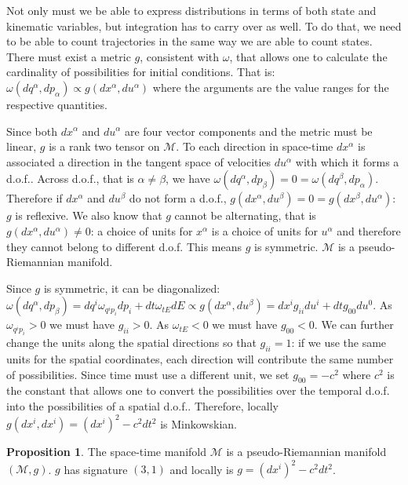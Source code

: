 \documentclass[aps,pra,10pt,twocolumn,floatfix,nofootinbib]{revtex4-1}
\numberwithin{equation}{section}
\theoremstyle{definition}
\newtheorem{prop}[equation]{Proposition}
\begin{document}
Not only must we be able to express distributions in terms of both state and kinematic variables, but integration has to carry over as well. To do that, we need to be able to count trajectories in the same way we are able to count states. There must exist a metric $g$, consistent with $\omega$, that allows one to calculate the cardinality of possibilities for initial conditions. That is: $\omega(dq^\alpha,dp_\alpha) \propto g(dx^\alpha,du^\alpha)$ where the arguments are the value ranges for the respective quantities.

Since both $dx^\alpha$ and $du^\alpha$ are four vector components and the metric must be linear, $g$ is a rank two tensor on $\mathcal{M}$. To each direction in space-time $dx^\alpha$ is associated a direction in the tangent space of velocities $du^\alpha$ with which it forms a d.o.f.. Across d.o.f., that is $\alpha \neq \beta$, we have $\omega(dq^\alpha, dp_\beta) = 0 =\omega(dq^\beta, dp_\alpha)$. Therefore if $dx^\alpha$ and $du^\beta$ do not form a d.o.f., $g(dx^\alpha, du^\beta) = 0 = g(dx^\beta, du^\alpha)$: $g$ is reflexive. We also know that $g$ cannot be alternating, that is $g(dx^\alpha, du^\alpha) \neq 0$: a choice of units for $x^\alpha$ is a choice of units for $u^\alpha$ and therefore they cannot belong to different d.o.f. This means $g$ is symmetric. $\mathcal{M}$ is a pseudo-Riemannian manifold.

Since $g$ is symmetric, it can be diagonalized: $\omega(dq^\alpha, dp_\beta)= dq^i \omega_{q^ip_i} dp_i + dt \omega_{tE} dE \propto g(dx^\alpha, du^\beta) = dx^i g_{ii} du^i + dt g_{00} du^0$. As $\omega_{q^ip_i} > 0$ we must have $g_{ii} > 0$. As $\omega_{tE} < 0$ we must have $g_{00} < 0$. We can further change the units along the spatial directions so that $g_{ii}=1$: if we use the same units for the spatial coordinates, each direction will contribute the same number of possibilities. Since time must use a different unit, we set $g_{00}=-c^2$ where $c^2$ is the constant that allows one to convert the possibilities over the temporal d.o.f. into the possibilities of a spatial d.o.f.. Therefore, locally $g(dx^i, dx^i) = (dx^i)^2 - c^2 dt^2$ is Minkowskian.

\begin{prop}\label{riemannian_manifold}
	The space-time manifold $\mathcal{M}$ is a pseudo-Riemannian manifold $(\mathcal{M}, g)$. $g$ has signature $(3,1)$ and locally is $g = (dx^i)^2 - c^2 dt^2$.
\end{prop}
\end{document}
